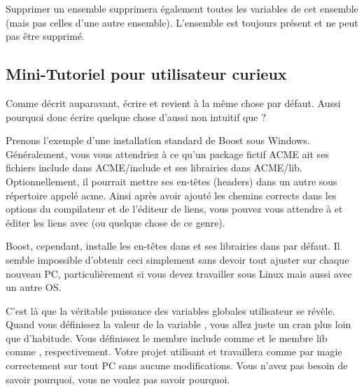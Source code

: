 Supprimer un ensemble supprimera également toutes les variables de cet ensemble (mais pas celles d'une autre ensemble). L'ensemble  est toujours présent et ne peut pas être supprimé.

\subsection{Mini-Tutoriel pour utilisateur curieux}\label{sec:mini_tutorial}

Comme décrit auparavant, écrire  et  revient à la même chose par défaut. Aussi pourquoi donc écrire quelque chose d'aussi non intuitif que ?

Prenons l'exemple d'une installation standard de Boost sous Windows. Généralement, vous vous attendriez à ce qu'un package fictif ACME ait ses fichiers include dans ACME/include et ses librairies dans ACME/lib. Optionnellement, il pourrait mettre ses en-têtes (headers) dans un autre sous répertoire appelé acme. Ainsi après avoir ajouté les chemins corrects dans les options du compilateur et de l'éditeur de liens, vous pouvez vous attendre à  et éditer les liens avec  (ou quelque chose de ce genre).

Boost, cependant, installe les en-têtes dans  et ses librairies dans  par défaut. Il semble impossible d'obtenir ceci simplement sans devoir tout ajuster sur chaque nouveau PC, particulièrement si vous devez travailler sous Linux mais aussi avec un autre OS.

C'est là que la véritable puissance des variables globales utilisateur se révèle. Quand vous définissez la valeur de la variable , vous allez juste un cran plus loin que d'habitude. Vous définissez le membre include comme  et le membre lib comme , respectivement. Votre projet utilisant  et  travaillera comme par magie correctement sur tout PC sans aucune modifications. Vous n'avez pas besoin de savoir pourquoi, vous ne voulez pas savoir pourquoi.
